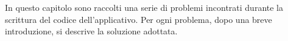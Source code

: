 In questo capitolo sono raccolti una serie di problemi incontrati durante la scrittura del codice dell'applicativo. Per ogni problema, dopo una breve introduzione, si descrive la soluzione adottata.